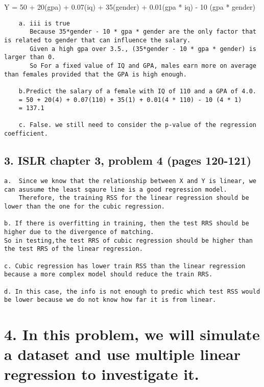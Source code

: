 \documentclass[11pt]{article}
\begin{document}
Y = 50 + 20(gpa) + 0.07(iq) + 35(gender) + 0.01(gpa * iq) - 10 (gpa *
gender)

\begin{verbatim}
    a. iii is true
       Because 35*gender - 10 * gpa * gender are the only factor that is related to gender that can influence the salary.
       Given a high gpa over 3.5., (35*gender - 10 * gpa * gender) is larger than 0.
       So For a fixed value of IQ and GPA, males earn more on average than females provided that the GPA is high enough.
    
    b.Predict the salary of a female with IQ of 110 and a GPA of 4.0.         
    = 50 + 20(4) + 0.07(110) + 35(1) + 0.01(4 * 110) - 10 (4 * 1) 
    = 137.1

    c. False. we still need to consider the p-value of the regression coefficient.
\end{verbatim}

    \hypertarget{islr-chapter-3-problem-4-pages-120-121}{%
\subsection{3. ISLR chapter 3, problem 4 (pages
120-121)}\label{islr-chapter-3-problem-4-pages-120-121}}

\begin{verbatim}
a.  Since we know that the relationship between X and Y is linear, we can asusume the least sqaure line is a good regression model.
    Therefore, the training RSS for the linear regression should be lower than the one for the cubic regression.
    
b. If there is overfitting in training, then the test RRS should be higher due to the divergence of matching.
So in testing,the test RRS of cubic regression should be higher than the test RRS of the linear regression.

c. Cubic regression has lower train RSS than the linear regression because a more complex model should reduce the train RRS.

d. In this case, the info is not enough to predic which test RSS would be lower because we do not know how far it is from linear. 
\end{verbatim}

    \hypertarget{in-this-problem-we-will-simulate-a-dataset-and-use-multiple-linear-regression-to-investigate-it.}{%
\section{4. In this problem, we will simulate a dataset and use multiple
linear regression to investigate
it.}\label{in-this-problem-we-will-simulate-a-dataset-and-use-multiple-linear-regression-to-investigate-it.}}
\end{document}
